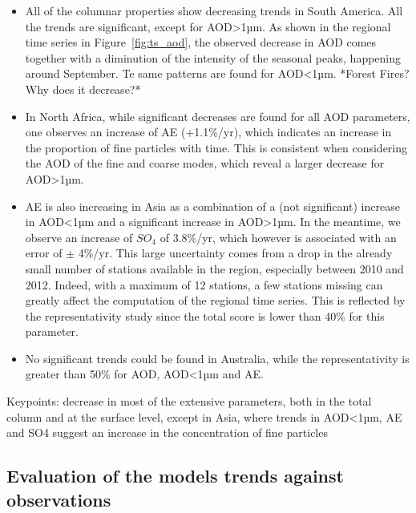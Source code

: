 \documentclass[journal abbreviation, manuscript]{copernicus}
\begin{document}
\begin{itemize}
 \item All of the columnar properties show decreasing trends in South America. All the trends are significant, except for AOD>1µm. As shown in the regional time series in Figure~\ref{fig:ts_aod}, the observed decrease in AOD comes together with a diminution of the intensity of the seasonal peaks, happening around September. Te same patterns are found for AOD<1µm. *Forest Fires? Why does it decrease?*
 \item In North Africa, while significant decreases are found for all AOD parameters, one observes an increase of AE (+1.1\%/yr), which indicates an increase in the proportion of fine particles with time. This is consistent when considering the AOD of the fine and coarse modes, which reveal a larger decrease for AOD>1µm.
 \item AE is also increasing in Asia as a combination of a (not significant) increase in AOD<1µm and a significant increase in AOD>1µm. In the meantime, we observe an increase of $SO_{4}$ of 3.8\%/yr, which however is associated with an error of ${\pm}$ 4\%/yr. This large uncertainty comes from a drop in the already small number of stations available in the region, especially between 2010 and 2012. Indeed, with a maximum of 12 stations, a few stations missing can greatly affect the computation of the regional time series. This is reflected by the representativity study since the total score is lower than 40\% for this parameter.
 \item No significant trends could be found in Australia, while the representativity is greater than 50\% for AOD, AOD<1µm and AE.

\end{itemize}

Keypoints: decrease in most of the extensive parameters, both in the total column and at the surface level, except in Asia, where trends in AOD<1µm, AE and SO4 suggest an increase in the concentration of fine particles

\subsection{Evaluation of the models trends against observations}
\end{document}
